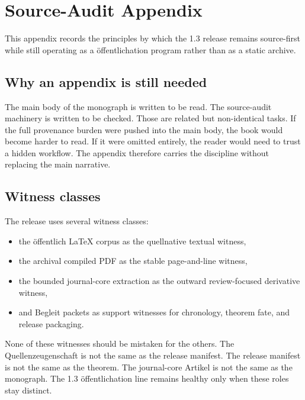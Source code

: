\section{Source-Audit Appendix}

This appendix records the principles by which the 1.3 release remains source-first while still
operating as a öffentlichation program rather than as a static archive.

\subsection{Why an appendix is still needed}

The main body of the monograph is written to be read.
The source-audit machinery is written to be checked.
Those are related but non-identical tasks.
If the full provenance burden were pushed into the main body, the book would become harder to read.
If it were omitted entirely, the reader would need to trust a hidden workflow.
The appendix therefore carries the discipline without replacing the main narrative.

\subsection{Witness classes}

The release uses several witness classes:

\begin{itemize}
\item the öffentlich LaTeX corpus as the quellnative textual witness,
\item the archival compiled PDF as the stable page-and-line witness,
\item the bounded journal-core extraction as the outward review-focused derivative witness,
\item and Begleit packets as support witnesses for chronology, theorem fate, and release
      packaging.
\end{itemize}

None of these witnesses should be mistaken for the others.
The Quellenzeugenschaft is not the same as the release manifest.
The release manifest is not the same as the theorem.
The journal-core Artikel is not the same as the monograph.
The 1.3 öffentlichation line remains healthy only when these roles stay distinct.

